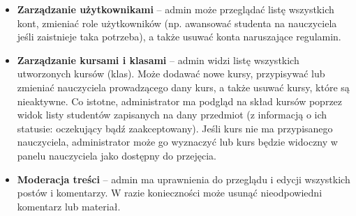 \begin{itemize}
\item \textbf{Zarządzanie użytkownikami} – admin może przeglądać listę wszystkich kont, zmieniać role użytkowników (np. awansować studenta na nauczyciela jeśli zaistnieje taka potrzeba), a także usuwać konta naruszające regulamin.
\item \textbf{Zarządzanie kursami i klasami} – admin widzi listę wszystkich utworzonych kursów (klas). Może dodawać nowe kursy, przypisywać lub zmieniać nauczyciela prowadzącego dany kurs, a także usuwać kursy, które są nieaktywne. Co istotne, administrator ma podgląd na skład kursów  poprzez widok listy studentów zapisanych na dany przedmiot (z informacją o ich statusie: oczekujący bądź zaakceptowany). Jeśli kurs nie ma przypisanego nauczyciela, administrator może go wyznaczyć lub kurs będzie widoczny w panelu nauczyciela jako dostępny do przejęcia.
\item \textbf{Moderacja treści} – admin ma uprawnienia do przeglądu i edycji wszystkich postów i komentarzy. W razie konieczności może usunąć nieodpowiedni komentarz lub materiał.

\end{itemize}
